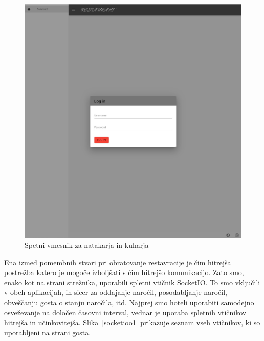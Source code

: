 \documentclass[a4paper, 12pt]{book}
\begin{document}
\begin{figure}[!htb]
\begin{center}
\includegraphics[width=12cm]{natakar-gost_1.jpg}
\caption{Spetni vmesnik za natakarja in kuharja}
\label{NatakarGost}
\end{center}
\end{figure}

Ena izmed pomembnih stvari pri obratovanje restavracije je čim hitrejša postrežba katero je mogoče izboljšati s čim hitrejšo komunikacijo. Zato smo, enako kot na strani strežnika, uporabili spletni vtičnik SocketIO. To smo vključili v obeh aplikacijah, in sicer za oddajanje naročil, posodabljanje naročil, obveščanju gosta o stanju naročila, itd. Najprej smo hoteli uporabiti samodejno osveževanje na določen časovni interval, vednar je uporaba spletnih vtičnikov hitrejša in učinkovitejša. Slika~\ref{socketioo1} prikazuje seznam vseh vtičnikov, ki so uporabljeni na strani gosta.
\end{document}
